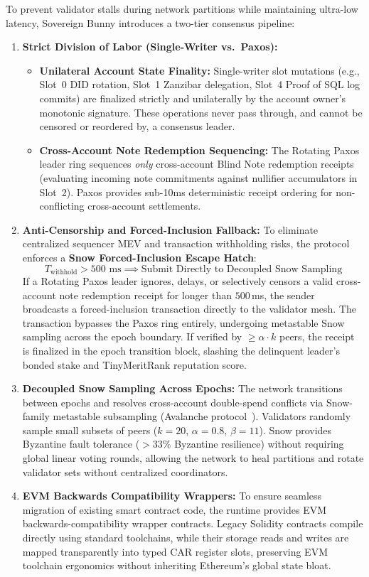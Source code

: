 \documentclass[a4paper,11pt,twoside,parskip=half-,headings=small]{scrartcl}
\begin{document}
To prevent validator stalls during network partitions while maintaining ultra-low latency,
Sovereign Bunny introduces a two-tier consensus pipeline:
\begin{enumerate}
  \item \textbf{Strict Division of Labor (Single-Writer vs.\ Paxos):}
  \begin{itemize}
    \item \textbf{Unilateral Account State Finality:} Single-writer slot mutations (e.g., Slot~0 DID rotation, Slot~1 Zanzibar delegation, Slot~4 Proof of SQL log commits) are finalized strictly and unilaterally by the account owner's monotonic signature. These operations never pass through, and cannot be censored or reordered by, a consensus leader.
    \item \textbf{Cross-Account Note Redemption Sequencing:} The Rotating Paxos leader ring sequences \emph{only} cross-account Blind Note redemption receipts (evaluating incoming note commitments against nullifier accumulators in Slot~2). Paxos provides sub-10ms deterministic receipt ordering for non-conflicting cross-account settlements.
  \end{itemize}
  \item \textbf{Anti-Censorship and Forced-Inclusion Fallback:} To eliminate centralized sequencer MEV and transaction withholding risks, the protocol enforces a \textbf{Snow Forced-Inclusion Escape Hatch}:
  \begin{equation}
    T_{\text{withhold}} > 500\text{ ms} \implies \text{Submit Directly to Decoupled Snow Sampling}
  \end{equation}
  If a Rotating Paxos leader ignores, delays, or selectively censors a valid cross-account note redemption receipt for longer than $500$\,ms, the sender broadcasts a forced-inclusion transaction directly to the validator mesh. The transaction bypasses the Paxos ring entirely, undergoing metastable Snow sampling across the epoch boundary. If verified by $\ge \alpha \cdot k$ peers, the receipt is finalized in the epoch transition block, slashing the delinquent leader's bonded stake and TinyMeritRank reputation score.
  \item \textbf{Decoupled Snow Sampling Across Epochs:} The network transitions between epochs
and resolves cross-account double-spend conflicts via Snow-family metastable subsampling
(Avalanche protocol~\cite{teamrocket2019}). Validators randomly sample small subsets of peers
($k=20$, $\alpha=0.8$, $\beta=11$). Snow provides Byzantine fault tolerance ($>33\%$ Byzantine resilience)
without requiring global linear voting rounds, allowing the network to heal partitions
and rotate validator sets without centralized coordinators.
  \item \textbf{EVM Backwards Compatibility Wrappers:} To ensure seamless migration of existing
smart contract code, the runtime provides EVM backwards-compatibility wrapper contracts.
Legacy Solidity contracts compile directly using standard toolchains, while their storage
reads and writes are mapped transparently into typed CAR register slots, preserving
EVM toolchain ergonomics without inheriting Ethereum's global state bloat.
\end{enumerate}
\end{document}
